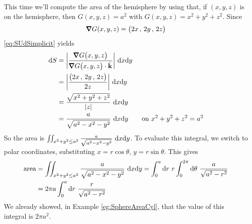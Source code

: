 \begin{eg}
       \label{eg:SphereImplicit}
This time we'll compute the area of the hemisphere by using that, if
$(x,y,z)$ is on the hemisphere, then $G(x,y,z) = a^2$ with 
$G(x,y,z) = x^2 + y^2 + z^2$.
Since 
\begin{equation*}
\vnabla G(x,y,z) = \big(2x\,,\,2y\,,\,2z\big)
\end{equation*}
\eqref{eq:SUdSimplicit} yields
\begin{align*}
\dee{S}
&= \bigg|\frac{\vnabla G\big(x,y,z\big)}{\vnabla G\big(x,y,z\big)\cdot\hk}\bigg|
            \ \dee{x}\dee{y} \\
&= \bigg|\frac{\big(2x\,,\,2y\,,\,2z\big)}{2z}\bigg|
            \ \dee{x}\dee{y} \\
&= \frac{\sqrt{x^2+y^2+z^2}}{|z|}
            \ \dee{x}\dee{y} \\
&= \frac{a}{\sqrt{a^2-x^2-y^2}}
            \ \dee{x}\dee{y} \qquad\text{on $x^2+y^2+z^2=a^2$}
\end{align*}
So the area is
$
\iint_{x^2+y^2\le a^2}\frac{a}{\sqrt{a^2-x^2-y^2}}
            \ \mathrm{d}x\mathrm{d}y 
$.
To evaluate this integral, we switch to polar coordinates, substituting
$x=r\cos\theta$, $y=r\sin\theta$. This gives
\begin{align*}
\text{area}
&=\iint_{x^2+y^2\le a^2}\frac{a}{\sqrt{a^2-x^2-y^2}}
            \ \mathrm{d}x\mathrm{d}y 
=\int_0^a\mathrm{d}r\ r\int_0^{2\pi}\mathrm{d}\theta\  \frac{a}{\sqrt{a^2-r^2}} \\
&=2\pi a \int_0^a\mathrm{d}r\ \frac{r}{\sqrt{a^2-r^2}}
\end{align*}
We already showed, in Example \ref{eg:SphereAreaCyl}, that the value
of this integral is $2\pi a^2$.
\end{eg}


